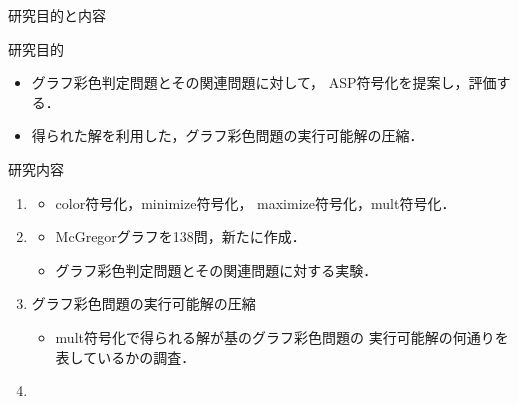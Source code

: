 \documentclass[dvipdfmx,11pt]{beamer}
\begin{document}
\begin{frame}{研究目的と内容}

 \begin{alertblock}{研究目的}
  \begin{itemize}
   \item グラフ彩色判定問題とその関連問題に対して，
         ASP符号化を提案し，評価する．
   \item 得られた解を利用した，グラフ彩色問題の実行可能解の圧縮．
  \end{itemize}

 \end{alertblock}

 \begin{block}{研究内容}
  \begin{enumerate}
   \item {}
         \begin{itemize}
          \item color符号化，minimize符号化，
                maximize符号化，mult符号化．
         \end{itemize}
   \item {}
         \begin{itemize}
          \item McGregorグラフを138問，新たに作成．
          \item グラフ彩色判定問題とその関連問題に対する実験．
         \end{itemize}
   \item \alert{グラフ彩色問題の実行可能解の圧縮}
         \begin{itemize}
          \item mult符号化で得られる解が基のグラフ彩色問題の
                実行可能解の何通りを表しているかの調査．
         \end{itemize}
   \item {}
  \end{enumerate}
 \end{block}
 
\end{frame}

\end{document}
